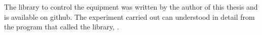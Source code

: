 The library to control the equipment was written by the author of this thesis
and is available on github\cite{ExperimentCode}.
The  experiment carried out can understood in detail
from the program that called the library, .














